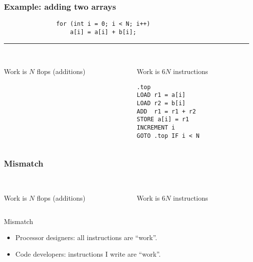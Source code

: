 \documentclass[dvipsnames,presentation,aspectratio=169,14pt]{beamer}
\begin{document}
\begin{frame}[fragile]
  \frametitle{Example: adding two arrays}\small
\begin{verbatim}
               for (int i = 0; i < N; i++)
                   a[i] = a[i] + b[i];
\end{verbatim}
  \vskip 11pt
  \pause
  \hrule
  \vskip 18pt
  \centering
  \begin{columns}[t]
    \hfill
    \begin{column}{0.4\textwidth}
      \\[4pt]

      Work is $N$ flops (additions)
    \end{column}
    \hfill
    \begin{column}{0.4\textwidth}
      \\[4pt]

      Work is 6$N$ instructions
\begin{verbatim}
.top
LOAD r1 = a[i]
LOAD r2 = b[i]
ADD  r1 = r1 + r2
STORE a[i] = r1
INCREMENT i
GOTO .top IF i < N
\end{verbatim}
    \end{column}
  \end{columns}
\end{frame}

\begin{frame}
  \frametitle{Mismatch}

  \centering
  \begin{columns}[t]
    \begin{column}{0.4\textwidth}
      \\[4pt]

      Work is $N$ flops (additions)
    \end{column}
    \begin{column}{0.4\textwidth}
      \\[4pt]

      Work is $6N$ instructions
    \end{column}
  \end{columns}

  \vskip 20pt

  \begin{challenge}{Mismatch}
    \begin{itemize}[itemsep = 5pt]
    \item Processor designers: all instructions are ``work''.
    \item Code developers: instructions I write are ``work''.
    \end{itemize}
  \end{challenge}
\end{frame}
\end{document}
